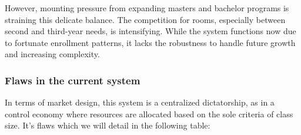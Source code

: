 \documentclass[a4paper, oneside]{article}
\begin{document}
However, mounting pressure from expanding masters and bachelor programs is straining this delicate balance. The competition for rooms,
especially between second and third-year needs, is intensifying. While the system functions now due to fortunate enrollment patterns,
it lacks the robustness to handle future growth and increasing complexity.

\subsubsection{Flaws in the current system}
In terms of market design, this system is a centralized dictatorship, as in a control economy where resources are allocated based on the sole criteria of class size. It's flaws which we will detail in the following table:\\
\end{document}
